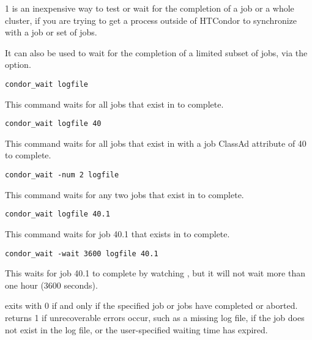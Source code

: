 \begin{ManPage}{\label{man-condor-wait}}{1}
 is an inexpensive way to test or wait for the completion
of a job or a whole cluster, if you are trying to get a process
outside of HTCondor to synchronize with a job or set of jobs.

It can also be used to wait for the completion of a limited subset of
jobs, via the  option.

\Examples

\begin{verbatim}
condor_wait logfile
\end{verbatim}
This command waits for all jobs that exist in  to complete.

\begin{verbatim}
condor_wait logfile 40
\end{verbatim}
This command waits for all jobs that exist in  
with a job ClassAd attribute  of
40 to complete.

\begin{verbatim}
condor_wait -num 2 logfile
\end{verbatim}
This command waits for any two jobs that exist in  to
complete.

\begin{verbatim}
condor_wait logfile 40.1
\end{verbatim}
This command waits for job 40.1 that exists in  to
complete.

\begin{verbatim}
condor_wait -wait 3600 logfile 40.1
\end{verbatim}
This waits for job 40.1 to
complete by watching , but it will not wait more than one
hour (3600 seconds).

\ExitStatus

 exits with 0 if and only if the specified job or jobs
have completed or
aborted.  returns 1 if unrecoverable errors occur, such
as a missing log file, if the job does not exist in the log file, or
the user-specified waiting time has expired.

\end{ManPage}
